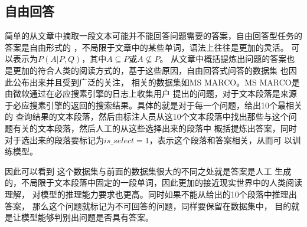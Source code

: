 


\subsection{自由回答}
简单的从文章中摘取一段文本可能并不能回答问题需要的答案，自由回答型任务的答案是自由形式的
，不局限于文章中的某些单词，语法上往往是更加的灵活。
可以表示为$P(A|P,Q)$，其中$A\subseteq P$或$A\nsubseteq P$。
从文章中概括提炼出问题的答案也是更加的符合人类的阅读方式的，基于这些原因，自由回答式问答的数据集
也因此公布出来并且受到广泛的关注，
相关的数据集如MS MARCO。MS MARCO是由微软通过在必应搜素引擎的日志上收集用户
提出的问题，对于文本段落是来源于必应搜素引擎的返回的搜索结果。具体的就是对于每一个问题，给出10个最相关的
查询结果的文本段落，然后由标注人员从这10个文本段落中找出那些与这个问题有关的文本段落，然后人工的从这些选择出来的段落中
概括提炼出答案，同时对于选出来的段落要标记为$is\_select=1$，表示这个段落和答案相关，从而可
以训练模型。

因此可以看到
这个数据集与前面的数据集很大的不同之处就是答案是人工
生成的，不局限于文本段落中固定的一段单词，因此更加的接近现实世界中的人类阅读理解，
对模型的推理能力要求也更高。同时如果不能从给出的10个段落中推理出答案，
那么这个问题就标记为不可回答的问题，同样要保留在数据集中，
目的就是让模型能够判别出问题是否具有答案。




